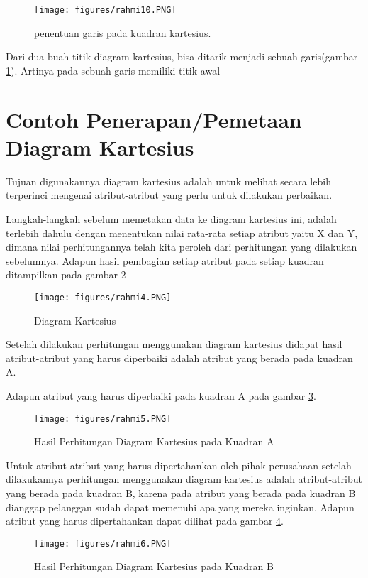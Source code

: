 \begin{figure}[ht]
	\centerline{\texttt{[image: figures/rahmi10.PNG]}}
	\caption{penentuan garis pada kuadran kartesius.}
	\label{rahmi10}
	\end{figure}

Dari dua buah titik diagram kartesius, bisa ditarik menjadi sebuah garis(gambar \ref{rahmi10}). Artinya pada sebuah garis memiliki titik awal


\section{Contoh Penerapan/Pemetaan Diagram Kartesius}
Tujuan digunakannya diagram kartesius adalah untuk melihat secara lebih terperinci mengenai atribut-atribut yang perlu untuk dilakukan perbaikan. 

Langkah-langkah sebelum memetakan data ke diagram kartesius ini, adalah terlebih dahulu dengan menentukan nilai rata-rata setiap atribut yaitu X dan Y, 
dimana nilai perhitungannya telah kita peroleh dari perhitungan yang dilakukan sebelumnya.
Adapun hasil pembagian setiap atribut pada setiap kuadran ditampilkan pada gambar 2

\begin{figure}[ht]
	\centerline{\texttt{[image: figures/rahmi4.PNG]}}
	\caption{Diagram Kartesius}
	\label{rahmi4}
	\end{figure}

Setelah dilakukan perhitungan menggunakan diagram kartesius didapat hasil atribut-atribut yang harus diperbaiki adalah atribut yang berada pada kuadran A.

Adapun atribut yang harus diperbaiki pada kuadran A pada gambar \ref{rahmi5}.


\begin{figure}[ht]
	\centerline{\texttt{[image: figures/rahmi5.PNG]}}
	\caption{Hasil Perhitungan Diagram Kartesius pada Kuadran A}
	\label{rahmi5}
	\end{figure}


Untuk atribut-atribut yang harus dipertahankan oleh pihak perusahaan setelah dilakukannya perhitungan menggunakan diagram kartesius adalah atribut-atribut
yang berada pada kuadran B, karena pada atribut yang berada pada kuadran B dianggap pelanggan sudah dapat memenuhi apa yang mereka inginkan. 
Adapun atribut yang harus dipertahankan dapat dilihat pada gambar \ref{rahmi6}.



\begin{figure}[ht]
	\centerline{\texttt{[image: figures/rahmi6.PNG]}}
	\caption{Hasil Perhitungan Diagram Kartesius pada Kuadran B}
	\label{rahmi6}
	\end{figure}

